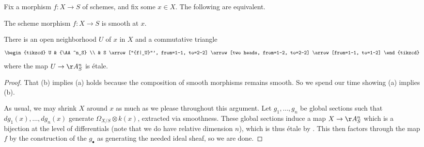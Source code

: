 \documentclass[../notes.tex]{subfiles}
\begin{document}
\begin{proposition}
	Fix a morphism $f\colon X\to S$ of schemes, and fix some $x\in X$. The following are equivalent.
	\begin{listalph}
		\item The scheme morphism $f\colon X\to S$ is smooth at $x$.
		\item There is an open neighborhood $U$ of $x$ in $X$ and a commutative triangle
		\[\begin{tikzcd}
			U & {\AA^n_S} \\
			& S
			\arrow["{f|_U}"', from=1-1, to=2-2]
			\arrow[two heads, from=1-2, to=2-2]
			\arrow[from=1-1, to=1-2]
		\end{tikzcd}\]
		where the map $U\to\AA^n_S$ is \'etale.
	\end{listalph}
\end{proposition}
\begin{proof}
	That (b) implies (a) holds because the composition of smooth morphisms remains smooth. So we spend our time showing (a) implies (b).

	As usual, we may shrink $X$ around $x$ as much as we please throughout this argument. Let $g_1,\ldots,g_n$ be global sections such that $dg_1(x),\ldots,dg_n(x)$ generate $\Omega_{X/S}\otimes k(x)$, extracted via smoothness. These global sections induce a map $X\to\AA^n_S$ which is a bijection at the level of differentials (note that we do have relative dimension $n$), which is thus \'etale by . This then factors through the map $f$ by the construction of the $g_\bullet$ as generating the needed ideal sheaf, so we are done.
\end{proof}
\end{document}
